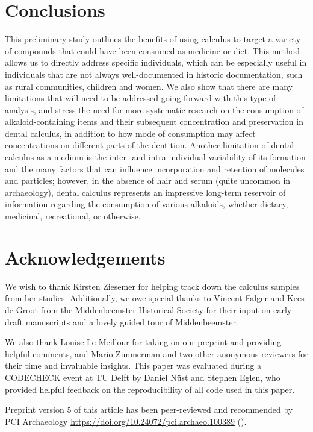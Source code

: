 \documentclass[
  11pt,
  leqno]{scrartcl}
\begin{document}
\section{Conclusions}\label{conclusions}

This preliminary study outlines the benefits of using calculus to target
a variety of compounds that could have been consumed as medicine or
diet. This method allows us to directly address specific individuals,
which can be especially useful in individuals that are not always
well-documented in historic documentation, such as rural communities,
children and women. We also show that there are many limitations that
will need to be addressed going forward with this type of analysis, and
stress the need for more systematic research on the consumption of
alkaloid-containing items and their subsequent concentration and
preservation in dental calculus, in addition to how mode of consumption
may affect concentrations on different parts of the dentition. Another
limitation of dental calculus as a medium is the inter- and
intra-individual variability of its formation and the many factors that
can influence incorporation and retention of molecules and particles;
however, in the absence of hair and serum (quite uncommon in
archaeology), dental calculus represents an impressive long-term
reservoir of information regarding the consumption of various alkaloids,
whether dietary, medicinal, recreational, or otherwise.

\section*{Acknowledgements}\label{acknowledgements}

We wish to thank Kirsten Ziesemer for helping track down the calculus
samples from her studies. Additionally, we owe special thanks to Vincent
Falger and Kees de Groot from the Middenbeemster Historical Society for
their input on early draft manuscripts and a lovely guided tour of
Middenbeemster.

We also thank Louise Le Meillour for taking on our preprint and
providing helpful comments, and Mario Zimmerman and two other anonymous
reviewers for their time and invaluable insights. This paper was
evaluated during a CODECHECK event at TU Delft by Daniel Nüst and
Stephen Eglen, who provided helpful feedback on the reproducibility of
all code used in this paper.

Preprint version 5 of this article has been peer-reviewed and
recommended by PCI Archaeology
\url{https://doi.org/10.24072/pci.archaeo.100389}
().
\end{document}
